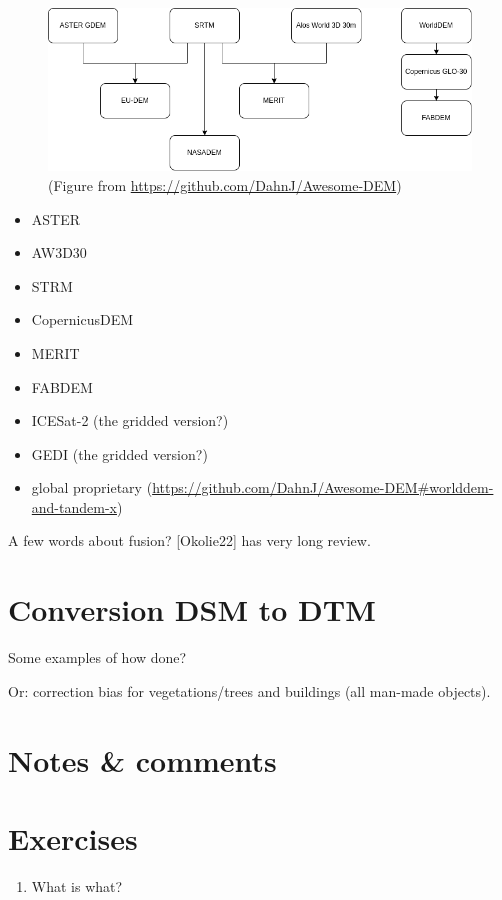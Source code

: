 \begin{figure}
  \centering
  \includegraphics[width=\linewidth]{gdem_inheritance}
  \caption{(Figure from \url{https://github.com/DahnJ/Awesome-DEM})}%
\end{figure}

\begin{itemize}
  \item ASTER
  \item AW3D30
  \item STRM
  \item CopernicusDEM
  \item MERIT
  \item FABDEM
  \item ICESat-2 (the gridded version?)
  \item GEDI (the gridded version?)
  \item global proprietary (\url{https://github.com/DahnJ/Awesome-DEM#worlddem-and-tandem-x})
\end{itemize}

A few words about fusion? [Okolie22] has very long review.


%
\section{Conversion DSM to DTM}

Some examples of how done?

Or: correction bias for vegetations/trees and buildings (all man-made objects).

%
\section{Notes \& comments}


%
\section{Exercises}

\begin{enumerate}
  \item What is what?
\end{enumerate}
